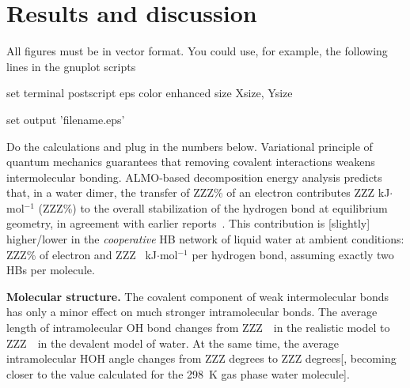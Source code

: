 \documentclass[prl,twocolumn,showpacs]{revtex4}
\begin{document}
\section{Results and discussion}

\new All figures must be in vector format. You could use, for example, the following lines in the gnuplot scripts

set terminal postscript eps color enhanced size Xsize, Ysize

set output 'filename.eps'

\old

\new Do the calculations and plug in the numbers below. \old Variational principle of quantum mechanics guarantees that removing covalent interactions weakens intermolecular bonding. ALMO-based decomposition energy analysis predicts that, in a water dimer, the transfer of ZZZ\% of an electron contributes ZZZ kJ$\cdot$mol$^{-1}$ (ZZZ\%) to the overall stabilization of the hydrogen bond at equilibrium geometry, in agreement with earlier reports~\cite{ZZZ}. This contribution is [slightly] higher/lower in the \emph{cooperative} HB network of liquid water at ambient conditions:  ZZZ\% of electron and ZZZ ~kJ$\cdot$mol$^{-1}$ per hydrogen bond, assuming exactly two HBs per molecule.

\textbf{Molecular structure.} The covalent component of weak intermolecular bonds has only a minor effect on much stronger intramolecular bonds. The average length of intramolecular OH bond changes from ZZZ~\Ang\ in the realistic model to ZZZ~\Ang\ in the devalent model of water. At the same time, the average intramolecular HOH angle changes from ZZZ degrees to ZZZ degrees[, becoming closer to the value calculated for the 298~K gas phase water molecule].
\end{document}
